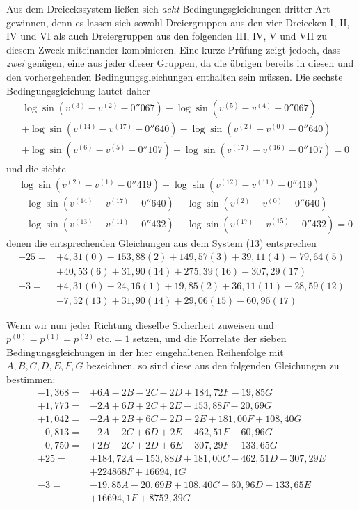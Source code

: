 Aus dem Dreieckssystem ließen sich \textit{acht} Bedingungsgleichungen dritter Art gewinnen, denn es lassen sich sowohl Dreiergruppen aus den vier Dreiecken I, II, IV und VI als auch Dreiergruppen aus den folgenden
III, IV, V und VII zu diesem Zweck miteinander kombinieren. Eine kurze Prüfung zeigt jedoch, dass \textit{zwei} genügen, eine aus jeder dieser Gruppen, da die übrigen bereits in diesen und den vorhergehenden Bedingungsgleichungen enthalten sein müssen. Die sechste Bedingungsgleichung lautet daher
\[
\begin{aligned}
&\log\sin(v^{(3)}-v^{(2)}-0''067)-\log\sin(v^{(5)}-v^{(4)}-0''067)\\
&+\log\sin(v^{(14)}-v^{(17)}-0''640)-\log\sin(v^{(2)}-v^{(0)}-0''640)\\
&+\log\sin(v^{(6)}-v^{(5)}-0''107)-\log\sin(v^{(17)}-v^{(16)}-0''107)=0
\end{aligned}
\]
und die siebte
\[
\begin{aligned}
&\log\sin(v^{(2)}-v^{(1)}-0''419)-\log\sin(v^{(12)}-v^{(11)}-0''419)\\
&+\log\sin(v^{(14)}-v^{(17)}-0''640)-\log\sin(v^{(2)}-v^{(0)}-0''640)\\
&+\log\sin(v^{(13)}-v^{(11)}-0''432)-\log\sin(v^{(17)}-v^{(15)}-0''432)=0
\end{aligned}
\]
denen die entsprechenden Gleichungen aus dem System (13) entsprechen
\[
\begin{aligned}
+25={}&+4{,}31(0)-153{,}88(2)+149{,}57(3)+39{,}11(4)-79{,}64(5)\\
&+40{,}53(6)+31{,}90(14)+275{,}39(16)-307{,}29(17)\\
-3={}&+4{,}31(0)-24{,}16(1)+19{,}85(2)+36{,}11(11)-28{,}59(12)\\
&-7{,}52(13)+31{,}90(14)+29{,}06(15)-60{,}96(17)
\end{aligned}
\]

Wenn wir nun jeder Richtung dieselbe Sicherheit zuweisen und \(p^{(0)}=p^{(1)}=p^{(2)}\ \text{etc.}=1\) setzen, und die Korrelate der sieben Bedingungsgleichungen in der hier eingehaltenen Reihenfolge mit \(A,B,C,D,E,F,G\) bezeichnen, so sind diese aus den folgenden Gleichungen zu bestimmen:
\[
\begin{aligned}
-1{,}368={}&+6A-2B-2C-2D+184{,}72F-19{,}85G\\
+1{,}773={}&-2A+6B+2C+2E-153{,}88F-20{,}69G\\
+1{,}042={}&-2A+2B+6C-2D-2E+181{,}00F+108{,}40G\\
-0{,}813={}&-2A-2C+6D+2E-462{,}51F-60{,}96G\\
-0{,}750={}&+2B-2C+2D+6E-307{,}29F-133{,}65G\\
+25={}&+184{,}72A-153{,}88B+181{,}00C-462{,}51D-307{,}29E\\
&+224868F+16694{,}1G\\
-3={}&-19{,}85A-20{,}69B+108{,}40C-60{,}96D-133{,}65E\\
&+16694{,}1F+8752{,}39G
\end{aligned}
\]

